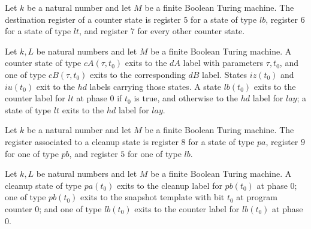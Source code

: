 \begin{definition}
\label{Complexity.UTab.CpS.dst}
\leanok
{}
Let $k$ be a natural number and let $M$ be a finite Boolean Turing machine. The
destination register of a counter state is register $5$ for a state of type $lb$,
register $6$ for a state of type $lt$, and register $7$ for every other counter state.
\end{definition}

\begin{definition}
\label{Complexity.UTab.CpS.exit}
\leanok
{}
Let $k,L$ be natural numbers and let $M$ be a finite Boolean Turing machine. A counter
state of type $cA(\tau,t_0)$ exits to the $dA$ label with parameters $\tau,t_0$, and one
of type $cB(\tau,t_0)$ exits to the corresponding $dB$ label. States $iz(t_0)$ and
$iu(t_0)$ exit to the $hd$ labels carrying those states. A state $lb(t_0)$ exits to the
counter label for $lt$ at phase $0$ if $t_0$ is true, and otherwise to the $hd$ label
for $lay$; a state of type $lt$ exits to the $hd$ label for $lay$.
\end{definition}

\begin{definition}
\label{Complexity.UTab.ClS.reg}
\leanok
{}
Let $k$ be a natural number and let $M$ be a finite Boolean Turing machine. The register
associated to a cleanup state is register $8$ for a state of type $pa$, register $9$ for
one of type $pb$, and register $5$ for one of type $lb$.
\end{definition}

\begin{definition}
\label{Complexity.UTab.ClS.exit}
\leanok
{}
Let $k,L$ be natural numbers and let $M$ be a finite Boolean Turing machine. A cleanup
state of type $pa(t_0)$ exits to the cleanup label for $pb(t_0)$ at phase $0$; one of
type $pb(t_0)$ exits to the snapshot template with bit $t_0$ at program counter $0$; and
one of type $lb(t_0)$ exits to the counter label for $lb(t_0)$ at phase $0$.
\end{definition}

